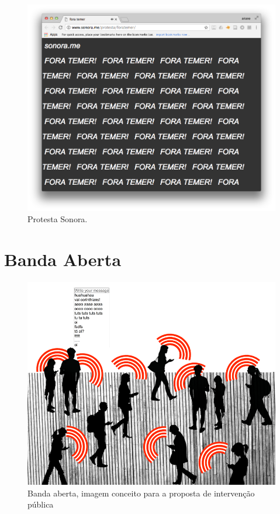 \begin{figure}
    \caption{\label{protesta}Protesta Sonora. }
    \begin{center}
    \includegraphics[width=1\linewidth]{pictures/cap3/protesta}
    \end{center}
\end{figure}



\section{Banda Aberta}
\begin{figure}[htb]
    \caption{\label{bandaabertamob}Banda aberta, imagem conceito para a proposta de intervenção pública}
    \begin{center}
    \includegraphics[width=1\linewidth]{pictures/banda_aberta_mob_crowd.png}
    \end{center}
\end{figure}


